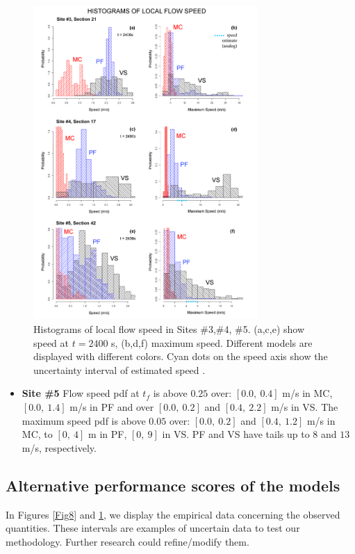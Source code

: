 \documentclass[nhess, manuscript]{copernicus}
\begin{document}
\begin{figure}[H]
\centering
\includegraphics[width=0.76\textwidth]{Fig9.png}
\caption{Histograms of local flow speed in Sites \#3,\#4, \#5. (a,c,e) show speed at $t=2400$ s, (b,d,f) maximum speed. Different models are displayed with different colors. Cyan dots on the speed axis show the uncertainty interval of estimated speed \cite{Pierson1985}.}
\label{Fig9}
\end{figure}

\begin{itemize}
\item\textbf{Site \#5} Flow speed pdf at $t_f$ is above $0.25$ over: $[0.0,\ 0.4]$ m/s in MC, $[0.0,\ 1.4]$ m/s in PF and over $[0.0,\ 0.2]$ and $[0.4,\ 2.2]$  m/s in VS. The maximum speed pdf is above $0.05$ over: $[0.0,\ 0.2]$ and $[0.4,\ 1.2]$ m/s in MC, to $[0,\ 4]$ m in PF, $[0,\ 9]$ in VS. PF and VS have tails up to $8$ and $13$ m/s, respectively.
\end{itemize}

\subsection{Alternative performance scores of the models}
In  Figures \ref{Fig8} and \ref{Fig9}, we display the empirical data concerning the observed quantities. These intervals are examples of uncertain data to test our methodology. Further research could refine/modify them.
\end{document}
